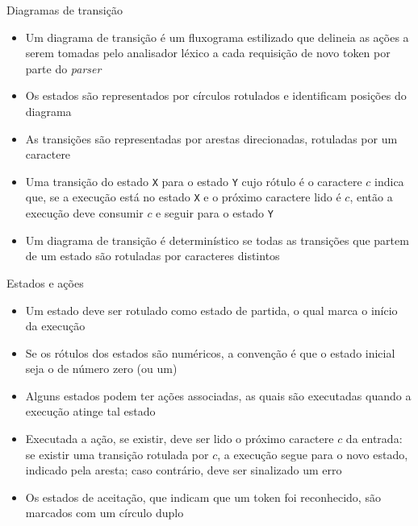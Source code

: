 \begin{frame}[fragile]{Diagramas de transição}

    \begin{itemize}
        \item Um diagrama de transição é um fluxograma estilizado que delineia as ações a serem tomadas pelo analisador léxico a cada requisição de novo token
            por parte do \textit{parser}
        \pause

        \item Os estados são representados por círculos rotulados e identificam posições do diagrama 
        \pause

        \item As transições são representadas por arestas direcionadas, rotuladas por um caractere
        \pause

        \item Uma transição do estado \texttt{X} para o estado \texttt{Y} cujo rótulo é o caractere $c$ indica que, se a execução está no estado \texttt{X} e
            o próximo caractere lido é $c$, então a execução deve consumir $c$ e seguir para o estado \texttt{Y}
        \pause

        \item Um diagrama de transição é determinístico se todas as transições que partem de um estado são rotuladas por caracteres distintos
    \end{itemize}

\end{frame}

\begin{frame}[fragile]{Estados e ações}

    \begin{itemize}
        \item Um estado deve ser rotulado como estado de partida, o qual marca o início da execução
        \pause

        \item Se os rótulos dos estados são numéricos, a convenção é que o estado inicial seja o de número zero (ou um)
        \pause

        \item Alguns estados podem ter ações associadas, as quais são executadas quando a execução atinge tal estado
        \pause

        \item Executada a ação, se existir, deve ser lido o próximo caractere $c$ da entrada: se existir uma transição rotulada por $c$, a execução segue
            para o novo estado, indicado pela aresta; caso contrário, deve ser sinalizado um erro
        \pause

        \item Os estados de aceitação, que indicam que um token foi reconhecido, são marcados com um círculo duplo
    \end{itemize}

\end{frame}

